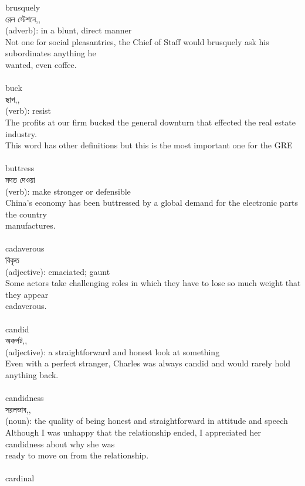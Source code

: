 \documentclass{article}
\begin{document}
{brusquely}\\
{রেল স্টেশনে,,}\\
{(adverb): in a blunt, direct manner\\Not one for social pleasantries, the Chief of Staff would brusquely ask his subordinates anything he\\wanted, even coffee.\\}\\
{buck}\\
{ছাগ,,}\\
{(verb): resist\\The profits at our firm bucked the general downturn that effected the real estate industry.\\This word has other definitions but this is the most important one for the GRE\\}\\
{buttress}\\
{মদত দেওয়া}\\
{(verb): make stronger or defensible\\China's economy has been buttressed by a global demand for the electronic parts the country\\manufactures.\\}\\
{cadaverous}\\
{বিকৃত}\\
{(adjective): emaciated; gaunt\\Some actors take challenging roles in which they have to lose so much weight that they appear\\cadaverous.\\}\\
{candid}\\
{অকপট,,}\\
{(adjective): a straightforward and honest look at something\\Even with a perfect stranger, Charles was always candid and would rarely hold anything back.\\}\\
{candidness}\\
{সরলভাব,,}\\
{(noun): the quality of being honest and straightforward in attitude and speech\\Although I was unhappy that the relationship ended, I appreciated her candidness about why she was\\ready to move on from the relationship.\\}\\
{cardinal}\\
\end{document}
